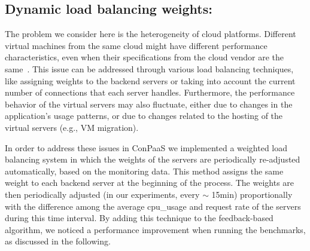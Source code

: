 \subsection{Dynamic load balancing weights: } 

The problem we consider here is the heterogeneity of cloud platforms.
Different virtual machines from the same cloud might have different performance
characteristics, even when their specifications from the cloud vendor are 
the same~\cite{ec2Performance}. This issue can be addressed through various 
load balancing techniques, like assigning weights to the backend servers or 
taking into account the current number of connections that each server 
handles. Furthermore, the performance behavior of the virtual servers may 
also fluctuate, either due to changes in the application's usage 
patterns, or due to changes related to the hosting of the virtual servers 
(e.g., VM migration).

In order to address these issues in ConPaaS we implemented a weighted 
load balancing system in which the weights of the servers are 
periodically re-adjusted automatically, based on the monitoring data.  
This method assigns the same weight to each backend server at the 
beginning of the process. The weights are then periodically
adjusted (in our experiments, every $\sim$ 15min) proportionally 
with the difference among the average cpu\_usage and request rate of the servers 
during this time interval. By adding this technique to the feedback-based
algorithm, we noticed a performance improvement when running the
benchmarks, as discussed in the following.



